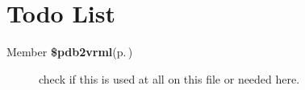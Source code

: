 \section{Todo List}\label{todo}
\label{_todo000001}
 \begin{description}
\item[Member {\bf \$pdb2vrml}{\rm (p.\,\pageref{processor_8php_a3})} ]check if this is used at all on this file or needed here. \end{description}
